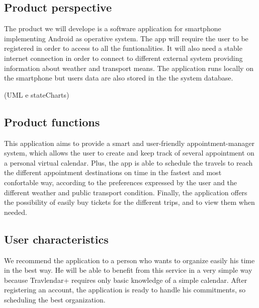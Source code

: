 \subsection{Product perspective} 
The product we will develope is a software application  for smartphone implementing Android as operative system. The app will require the user to be registered in order to access to all the funtionalities. It will also need a stable internet connection in order to connect to different external system providing information about weather and transport means. The application runs locally on the smartphone but users data are also stored in the the system database.

\begin{figure}[!h]
	\centering
\end{figure}

(UML e stateCharts)

\subsection{Product functions}
This application aims to provide a smart and user-friendly appointment-manager system, which allows the user to create and keep track of several appointment on a personal virtual calendar. Plus, the app is able to schedule the travels to reach the different appointment destinations on time in the fastest and most confortable way, according to the preferences expressed by the user and the different weather and public transport condition. Finally, the application offers the possibility of easily buy tickets for the different trips, and to view them when needed.
\subsection{User characteristics}
We recommend the application to a person who wants to organize easily his time in the best way. He will be able to benefit from this service in a very simple way because Travlendar+ requires only basic knowledge of a simple calendar. After registering an account, the application is ready to handle his commitments, so scheduling the best organization.
